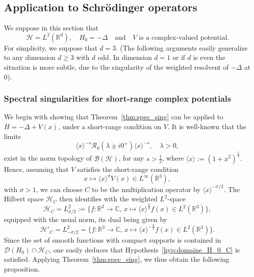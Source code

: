 \documentclass[AHL,Unicode,longabstracts,published]{cedram}
\newcommand{\Hi}{\mathcal{H}}
\newcommand{\bbC}{\mathbb{C}}
\newcommand{\R}{\mathbb{R}}
\newcommand{\Res}{\mathcal{R}}
\newcommand{\clB}{\mathcal{B}}
\newcommand{\clD}{\mathcal{D}}
\newcommand*\bbC{\mathbb{C}}
\newcommand{\Hi}{\mathcal{H}}
\newcommand{\R}{\mathbb{R}}
\begin{document}
\subsection{Application to Schr\"odinger operators}\label{subsec:appli}
We suppose in this section that
\begin{equation*}
\Hi=L^2(\R^d), \quad H_0=-\Delta \quad\text{and}\quad V\text{ is a complex-valued potential.}
\end{equation*}
For simplicity, we suppose that $d=3$. (The following arguments easily generalize to any dimension $d\ge3$ with $d$ odd. In dimension $d=1$ or if $d$ is even the situation is more subtle, due to the singularity of the weighted resolvent of $-\Delta$ at $0$).

\subsubsection{Spectral singularities for short-range complex potentials}
We begin with showing that Theorem~\ref{thm:spec_sing} can be applied to $H=-\Delta+V(x)$, under a short-range condition on $V$. It is well-known that the limits
\begin{equation}\label{eq:LAP-Delta}
\langle x\rangle^{-s}\Res_0(\lambda\pm i0^+)\langle x\rangle^{-s}, \quad \lambda >0,
\end{equation}
exist in the norm topology of $\clB(\Hi)$, for any $s>\frac12$, where $\langle x\rangle:=(1+x^2)^{\frac12}$. Hence, assuming that $V$ satisfies the short-range condition
\begin{equation}\label{eq:short-range}
x\mapsto \langle x\rangle^{\sigma}V(x) \in L^\infty(\R^3),
\end{equation}
with $\sigma>1$, we can choose $C$ to be the multiplication operator by $\langle x\rangle^{-\sigma/2}$. The Hilbert space $\Hi_C$ then identifies with the weighted $L^2$-space
\begin{equation*}
\Hi_C=L^2_{\sigma/2}:=\big\{f :\R^3\to\bbC, \, x\mapsto \langle x\rangle^{\frac{\sigma}{2}}f(x) \in L^2(\R^3) \big \},
\end{equation*}
equipped with the usual norm, its dual being given by
\begin{equation*}
\Hi'_C=L^2_{-\sigma/2}=\big\{f :\R^3\to\bbC, \, x\mapsto \langle x\rangle^{-\frac{\sigma}{2}}f(x) \in L^2(\R^3) \big \}.
\end{equation*}
Since the set of smooth functions with compact supports is contained in $\clD(H_0)\cap \Hi_C$, one easily deduces that Hypothesis~\ref{hyp:domaine_H_0_C} is satisfied. Applying Theorem~\ref{thm:spec_sing}, we thus obtain the following proposition.
\end{document}
